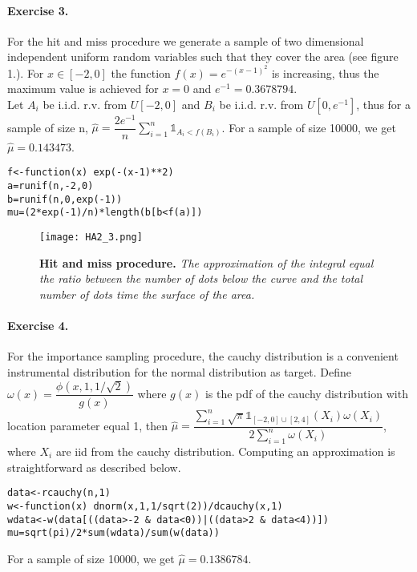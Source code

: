 \documentclass{article}
\begin{document}
\paragraph{Exercise 3.\\}
For the hit and miss procedure we generate a sample of two dimensional independent uniform random variables such that they cover the area (see figure 1.).
For $x \in [-2,0]$ the function $f(x)=e^{-(x-1)^2}$ is increasing, thus the maximum value is achieved for $x=0$ and $e^{-1}=0.3678794$. \\
Let $A_i$ be i.i.d. r.v. from $U[-2,0]$ and $B_i$ be i.i.d. r.v. from $U[0,e^{-1}]$, thus for a sample of size n, $\displaystyle \widehat{\mu}=\dfrac{2e^{-1}}{n}\sum_{i=1}^n  \mathds{1}_{A_i < f(B_i) }$.  For a sample of size 10000, we get $\widehat{\mu}=0.143473$. 
\begin{verbatim}
f<-function(x) exp(-(x-1)**2)
a=runif(n,-2,0)
b=runif(n,0,exp(-1))
mu=(2*exp(-1)/n)*length(b[b<f(a)]) 
\end{verbatim}
\begin{figure}[H]
	  \centering
  	\texttt{[image: HA2\_3.png]}
  	\caption{\textbf{Hit and miss procedure.} \textsl{The approximation of the integral equal the ratio between the number of dots below the curve and the total number of dots time the surface of the area.}
  	}
	\end{figure}
	
\paragraph{Exercise 4.\\}
For the importance sampling procedure, the cauchy distribution is a convenient instrumental distribution for the normal distribution as target. 
Define $\omega(x)=\dfrac{\phi(x,1,1/\sqrt{2})}{g(x)}$ where $g(x)$ is the pdf of the cauchy distribution with location parameter equal 1, then 
$\displaystyle \widehat{\mu} = \dfrac{ \sum_{i=1}^n \sqrt{\pi} \mathds{1}_{[-2,0]\cup [2,4]} (X_i) \omega(X_i) } {2\sum_{i=1}^n \omega(X_i)}$, where $X_i$ are iid from the cauchy distribution. Computing an approximation is straightforward as described below.
\begin{verbatim}
data<-rcauchy(n,1)
w<-function(x) dnorm(x,1,1/sqrt(2))/dcauchy(x,1)
wdata<-w(data[((data>-2 & data<0))|((data>2 & data<4))])
mu=sqrt(pi)/2*sum(wdata)/sum(w(data))
\end{verbatim}
For a sample of size 10000, we get $\widehat{\mu}=0.1386784$. 
\end{document}
